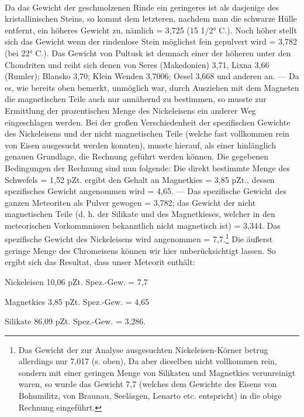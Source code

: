 \documentclass[a4paper, 11pt, oneside, german]{article}
\begin{document}
\paragraph{}
Da das Gewicht der geschmolzenen Rinde ein geringeres ist als dasjenige des kristallinischen Steins, so kommt dem letzteren, nachdem man die schwarze Hülle entfernt, ein höheres Gewicht zu, nämlich = 3,725 (15 1/2° C.). Noch höher stellt sich das Gewicht wenn der rindenlose Stein möglichst fein gepulvert wird = 3,782 (bei 22° C.). Das Gewicht von Pultusk ist demnach einer der höheren unter den Chondriten und reiht sich denen von Seres (Makedonien) 3,71, Lixna 3,66 (Rumler); Blansko 3,70; Klein Wenden 3,7006; Oesel 3,668 und anderen an. --- Da es, wie bereits oben bemerkt, unmöglich war, durch Ausziehen mit dem Magneten die magnetischen Teile auch nur annähernd zu bestimmen, so musste zur Ermittlung der prozentischen Menge des Nickeleisens ein anderer Weg eingeschlagen werden. Bei der großen Verschiedenheit der spezifischen Gewichte des Nickeleisens und der nicht magnetischen Teile (welche fast vollkommen rein von Eisen ausgesucht werden konnten), musste hierauf, als einer hinlänglich genauen Grundlage, die Rechnung geführt werden können. Die gegebenen Bedingungen der Rechnung sind nun folgende: Die direkt bestimmte Menge des Schwefels = 1,52 pZt. ergibt den Gehalt an Magnetkies = 3,85 pZt., dessen spezifisches Gewicht angenommen wird = 4,65. --- Das spezifische Gewicht des ganzen Meteoriten als Pulver gewogen = 3,782; das Gewicht der nicht magnetischen Teile (d. h. der Silikate und des Magnetkieses, welcher in den meteorischen Vorkommnissen bekanntlich nicht magnetisch ist) = 3,344. Das spezifische Gewicht des Nickeleisens wird angenommen = 7,7.\footnote{Das Gewicht der zur Analyse ausgesuchten Nickeleisen-Körner betrug allerdings nur 7,017 (s. oben), Da aber dieselben nicht vollkommen rein, sondern mit einer geringen Menge von Silikaten und Magnetkies verunreinigt waren, so wurde das Gewicht 7,7 (welches dem Gewichte des Eisens von Bohumilitz, von Braunau, Seeläsgen, Lenarto etc. entspricht) in die obige Rechnung eingeführt.} Die äußerst geringe Menge des Chromeisens können wir hier unberücksichtigt lassen. So ergibt sich das Resultat, dass unser Meteorit enthält:
\begin{center}
Nickeleisen 10,06 pZt. Spez.-Gew. = 7,7

Magnetkies 3,85 pZt. Spez.-Gew. = 4,65

Silikate 86,09 pZt. Spez.-Gew. = 3,286.
\end{center}
\end{document}
